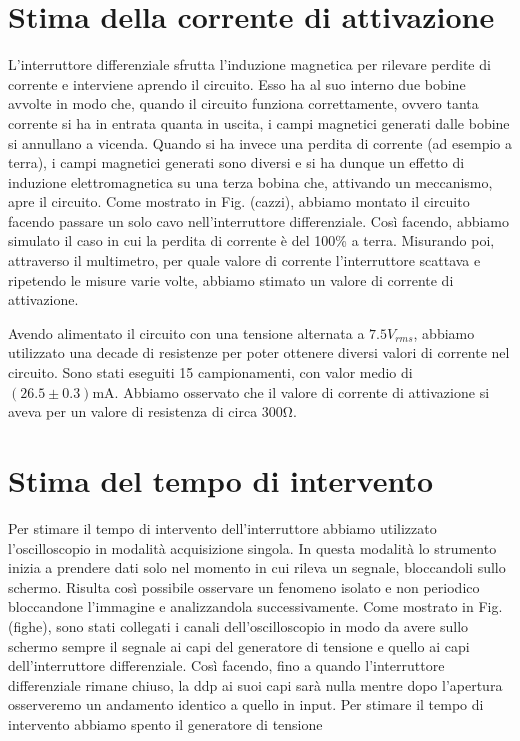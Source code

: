 \section{Stima della corrente di attivazione}
L'interruttore differenziale sfrutta l'induzione magnetica per rilevare perdite di corrente e interviene aprendo il circuito. Esso ha al suo interno due bobine avvolte in modo che, quando il circuito funziona correttamente, ovvero tanta corrente si ha in entrata quanta in uscita, i campi magnetici generati dalle bobine si annullano a vicenda. Quando si ha invece una perdita di corrente (ad esempio a terra), i campi magnetici generati sono diversi e si ha dunque un effetto di induzione elettromagnetica su una terza bobina che, attivando un meccanismo, apre il circuito. Come mostrato in Fig. (cazzi), abbiamo montato il circuito facendo passare un solo cavo nell'interruttore differenziale. Così facendo, abbiamo simulato il caso in cui la perdita di corrente è del 100\% a terra. Misurando poi, attraverso il multimetro, per quale valore di corrente l'interruttore scattava e ripetendo le misure varie volte, abbiamo stimato un valore di corrente di attivazione. 

Avendo alimentato il circuito con una tensione alternata a $7.5V_{rms}$, abbiamo utilizzato una decade di resistenze per poter ottenere diversi valori di corrente nel circuito. Sono stati eseguiti 15 campionamenti, con valor medio di $(26.5\pm0.3)\si{\milli\ampere}$. Abbiamo osservato che il valore di corrente di attivazione si aveva per un valore di resistenza di circa $300\si{\ohm}$. 


\section{Stima del tempo di intervento}
Per stimare il tempo di intervento dell'interruttore abbiamo utilizzato l'oscilloscopio in modalità acquisizione singola. In questa modalità lo strumento inizia a prendere dati solo nel momento in cui rileva un segnale, bloccandoli sullo schermo. Risulta così possibile osservare un fenomeno isolato e non periodico bloccandone l'immagine e analizzandola successivamente. Come mostrato in Fig.(fighe), sono stati collegati i canali dell'oscilloscopio in modo da avere sullo schermo sempre il segnale ai capi del generatore di tensione e quello ai capi dell'interruttore differenziale. Così facendo, fino a quando l'interruttore differenziale rimane chiuso, la ddp ai suoi capi sarà nulla mentre dopo l'apertura osserveremo un andamento identico a quello in input. Per stimare il tempo di intervento abbiamo spento il generatore di tensione